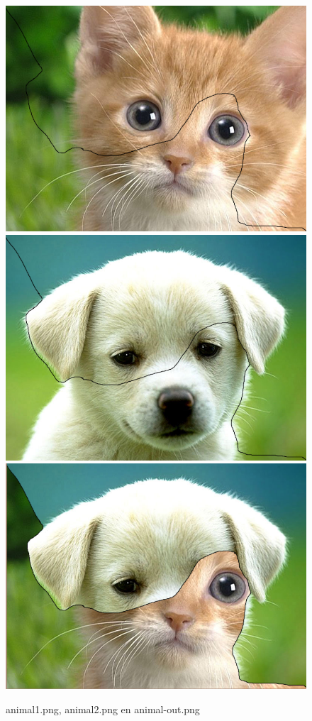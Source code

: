 \documentclass{article}
\begin{document}
\begin{figure}[h!]
\centering
\includegraphics[scale=0.2]{animal1.png}
\includegraphics[scale=0.2]{animal2.png}
\includegraphics[scale=0.2]{animal-out.png}
\caption{animal1.png, animal2.png en animal-out.png}
\label{fig:Animal}
\end{figure}
\newpage




\end{document}
